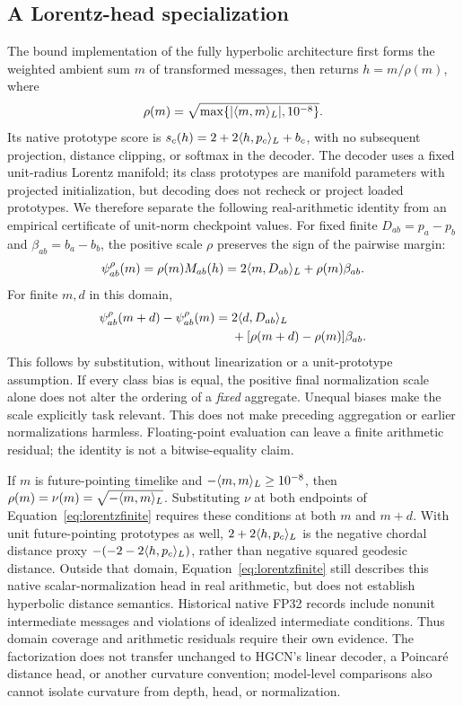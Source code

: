 \subsection{A Lorentz-head specialization}
The bound implementation of the fully hyperbolic architecture \cite{chen2022fully} first forms the weighted ambient sum $m$ of transformed messages, then returns $h=m/\rho(m)$, where
\begin{equation}
\rho(m)=\sqrt{\max\{|\langle m,m\rangle_L|,10^{-8}\}}.
\label{eq:nativerho}
\end{equation}
Its native prototype score is $s_c(h)=2+2\langle h,p_c\rangle_L+b_c$, with no subsequent projection, distance clipping, or softmax in the decoder. The decoder uses a fixed unit-radius Lorentz manifold; its class prototypes are manifold parameters with projected initialization, but decoding does not recheck or project loaded prototypes. We therefore separate the following real-arithmetic identity from an empirical certificate of unit-norm checkpoint values. For fixed finite $D_{ab}=p_a-p_b$ and $\beta_{ab}=b_a-b_b$, the positive scale $\rho$ preserves the sign of the pairwise margin:
\begin{equation}
\psi^\rho_{ab}(m)=\rho(m)M_{ab}(h)=2\langle m,D_{ab}\rangle_L+\rho(m)\beta_{ab}.
\label{eq:psi}
\end{equation}
For finite $m,d$ in this domain,
\begin{align}
\psi^\rho_{ab}(m+d)-\psi^\rho_{ab}(m)
={}&2\langle d,D_{ab}\rangle_L\notag\\
&+[\rho(m+d)-\rho(m)]\beta_{ab}.
\label{eq:lorentzfinite}
\end{align}
This follows by substitution, without linearization or a unit-prototype assumption. If every class bias is equal, the positive final normalization scale alone does not alter the ordering of a \emph{fixed} aggregate. Unequal biases make the scale explicitly task relevant. This does not make preceding aggregation or earlier normalizations harmless. Floating-point evaluation can leave a finite arithmetic residual; the identity is not a bitwise-equality claim.

If $m$ is future-pointing timelike and $-\langle m,m\rangle_L\geq10^{-8}$, then $\rho(m)=\nu(m)=\sqrt{-\langle m,m\rangle_L}$. Substituting $\nu$ at both endpoints of Equation~\eqref{eq:lorentzfinite} requires these conditions at both $m$ and $m+d$. With unit future-pointing prototypes as well, $2+2\langle h,p_c\rangle_L$ is the negative chordal distance proxy $-( -2-2\langle h,p_c\rangle_L)$, rather than negative squared geodesic distance. Outside that domain, Equation~\eqref{eq:lorentzfinite} still describes this native scalar-normalization head in real arithmetic, but does not establish hyperbolic distance semantics. Historical native FP32 records include nonunit intermediate messages and violations of idealized intermediate conditions. Thus domain coverage and arithmetic residuals require their own evidence. The factorization does not transfer unchanged to HGCN's linear decoder, a Poincar\'e distance head, or another curvature convention; model-level comparisons also cannot isolate curvature from depth, head, or normalization.

